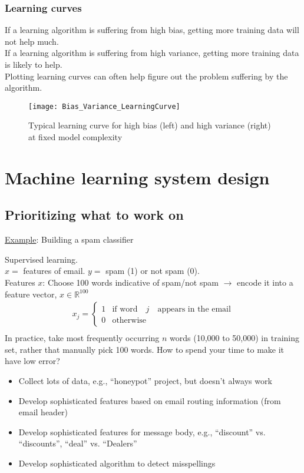 \subsubsection{Learning curves}
If a learning algorithm is suffering from high bias, getting more training data will not help much.\\
If a learning algorithm is suffering from high variance, getting more training data is likely to help.\\
Plotting learning curves can often help figure out the problem suffering by the algorithm.
\begin{figure}[h]
\centering
\texttt{[image: Bias\_Variance\_LearningCurve]}
\caption{Typical learning curve for high bias (left) and high variance (right) at fixed model complexity}
\label{fig:BiasvsVarianceLearningCurve}
\end{figure}

\section{Machine learning system design}
\label{sec:Machine learning system design}
%
\subsection{Prioritizing what to work on}
\underline{Example}: Building a spam classifier

Supervised learning.\\
$x = $ features of email. $y = $ spam (1) or not spam (0).\\
Features $x$: Choose 100 words indicative of spam/not spam $\rightarrow$ encode it into a feature vector, $x \in \mathbb{R}^{100}$
\begin{align*}
x_j = \left\{ \begin{array}{rll}
         1 & \text{if word} \quad j \quad \text{appears in the email}\\
         0 & \text{otherwise}
                \end{array}\right.\\
\end{align*}
In practice, take most frequently occurring $n$ words (10,000 to 50,000) in training set, rather that manually pick 100 words.
How to spend your time to make it have low error?
\begin{itemize}
\item
Collect lots of data, e.g., ``honeypot'' project, but doesn't always work
\item
Develop sophisticated features based on email routing information (from email header)
\item
Develop sophisticated features for message body, e.g., ``discount'' vs. ``discounts'', ``deal'' vs. ``Dealers''
\item
Develop sophisticated algorithm to detect misspellings
\end{itemize}

